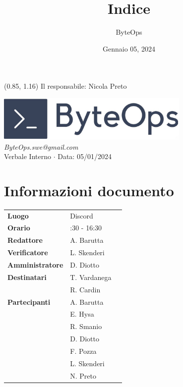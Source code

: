 \documentclass{article}
\title{\textbf{\fontsize{28}{6}\selectfont Indice}}
\author{\fontsize{14}{6}\selectfont ByteOps}
\date{Gennaio 05, 2024}
\begin{document}
\begin{textblock*}{\textwidth}(0.85\textwidth, 1.16\textheight)
    Il responsabile: Nicola Preto
\end{textblock*}

\pagestyle{fancy}
\begin{center}
\includegraphics[width = 0.7\textwidth]{../../Images/logo.png} \\
\vspace{0.2cm}
\textcolor[RGB]{60, 60, 60}{\textit{ByteOps.swe@gmail.com}} \\
\vspace{1cm}
\fontsize{16}{6}\selectfont Verbale Interno $\cdot$ Data: 05/01/2024 \\
\vspace{0.5cm}
\end{center}

\section*{Informazioni documento}
\def\arraystretch{1.2}
\begin{tabular}{>{\raggedleft\arraybackslash}p{}|>{\raggedright\arraybackslash}p{}c}
    \hline
    \addlinespace
    \textbf{Luogo} & Discord \vspace{10pt} \\
    \textbf{Orario} & 14:30 - 16:30 \vspace{10pt} \\
    \textbf{Redattore} & A. Barutta \vspace{10pt} \\
    \textbf{Verificatore} & L. Skenderi \vspace{10pt} \\
    \textbf{Amministratore} & D. Diotto \vspace{10pt} \\
    \textbf{Destinatari} & T. Vardanega \\ & R. Cardin \vspace{10pt} \\
    \textbf{Partecipanti} & A. Barutta \\ & E. Hysa \\ & R. Smanio \\ & D. Diotto \\ & F. Pozza \\ & L. Skenderi \\ & N. Preto \vspace{10pt} \\
\end{tabular}
\pagebreak 
\end{document}
